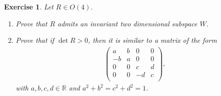 \documentclass[11pt]{article}
\newtheorem{exercise}{Exercise}[section]
\theoremstyle{definition}
\numberwithin{equation}{subsection}
\begin{document}
\begin{exercise}
Let $R \in O(4)$.
\begin{enumerate}[label=(\alph*)]
    \item Prove that $R$ admits an invariant two dimensional subspace $W$.
    
    \item Prove that if $\det R > 0$, then it is similar to a matrix of the form 
    \begin{align*}
        \begin{pmatrix}
            a & b & 0 & 0 \\
            -b & a & 0 & 0\\
            0 & 0 & c & d \\
            0 & 0 & -d & c\\ 
        \end{pmatrix},
    \end{align*}
    with $a, b, c, d \in \mathbb{R}$ and $a^2 + b^2 = c^2 + d^2 = 1$.
\end{enumerate}
\end{exercise}
\end{document}
